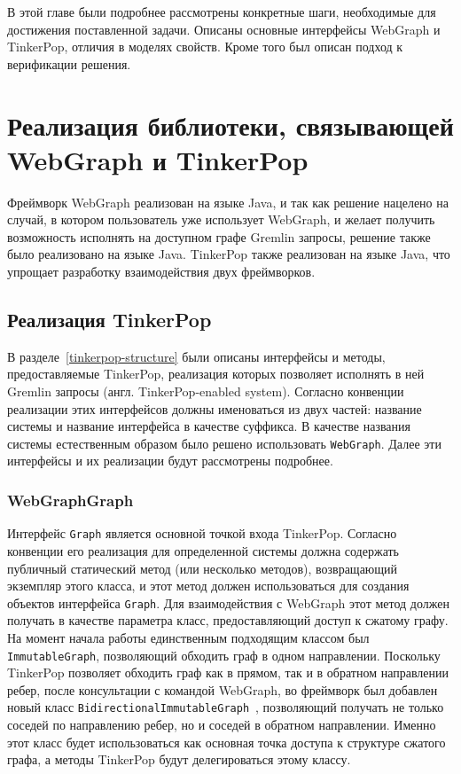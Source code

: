\documentclass[times,specification,annotation]{itmo-student-thesis}
\begin{document}
\chapterconclusion
В этой главе были подробнее рассмотрены конкретные шаги, необходимые для достижения поставленной задачи. Описаны основные интерфейсы WebGraph и TinkerPop, отличия в моделях свойств. Кроме того был описан подход к верификации решения.

\chapter{Реализация библиотеки, связывающей WebGraph и TinkerPop}

Фреймворк WebGraph реализован на языке Java, и так как решение нацелено на случай, в котором пользователь уже использует WebGraph, и желает получить возможность исполнять на доступном графе Gremlin запросы, решение также было реализовано на языке Java. TinkerPop также реализован на языке Java, что упрощает разработку взаимодействия двух фреймворков.

\section{Реализация TinkerPop}

В разделе~\ref{tinkerpop-structure} были описаны интерфейсы и методы, предоставляемые TinkerPop, реализация которых позволяет исполнять в ней Gremlin запросы (англ. TinkerPop-enabled system). Согласно конвенции реализации этих интерфейсов должны именоваться из двух частей: название системы и название интерфейса в качестве суффикса. В качестве названия системы естественным образом было решено использовать \texttt{WebGraph}. Далее эти интерфейсы и их реализации будут рассмотрены подробнее. 

\subsection{WebGraphGraph}

Интерфейс \texttt{Graph} является основной точкой входа TinkerPop. Согласно конвенции его реализация для определенной системы должна содержать публичный статический метод (или несколько методов), возвращающий экземпляр этого класса, и этот метод должен использоваться для создания объектов интерфейса \texttt{Graph}.
Для взаимодействия с WebGraph этот метод должен получать в качестве параметра класс, предоставляющий доступ к сжатому графу. На момент начала работы единственным подходящим классом был \texttt{ImmutableGraph}, позволяющий обходить граф в одном направлении.
Поскольку TinkerPop позволяет обходить граф как в прямом, так и в обратном направлении ребер, после консультации с командой WebGraph, во фреймворк был добавлен новый класс \texttt{BidirectionalImmutableGraph}~\cite{vigna-bidir}, позволяющий получать не только соседей по направлению ребер, но и соседей в обратном направлении. Именно этот класс будет использоваться как основная точка доступа к структуре сжатого графа, а методы TinkerPop будут делегироваться этому классу.
\end{document}
